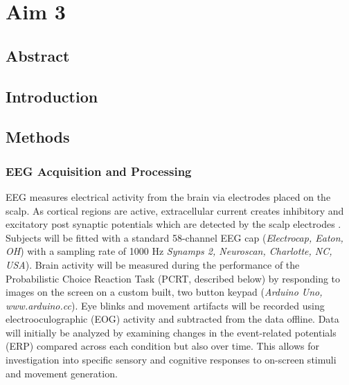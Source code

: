 \chapter{Aim 3}

\section{Abstract}

\section{Introduction}

\section{Methods}



\subsection{EEG Acquisition and Processing}
EEG measures electrical activity from the brain via electrodes placed on the scalp. As cortical regions are active, extracellular current creates inhibitory and excitatory post synaptic potentials which are detected by the scalp electrodes \cite{kuperberg_electroencephalography_2004}. Subjects will be fitted with a standard 58-channel EEG cap (\textit{Electrocap, Eaton, OH}) with a sampling rate of 1000 Hz \textit{Synamps 2, Neuroscan, Charlotte, NC, USA}). Brain activity will be measured during the performance of the Probabilistic Choice Reaction Task (PCRT, described below) by responding to images on the screen on a custom built, two button keypad (\textit{Arduino Uno, www.arduino.cc}). Eye blinks and movement artifacts will be recorded using electrooculographic (EOG) activity and subtracted from the data offline. Data will initially be analyzed by examining changes in the event-related potentials (ERP) compared across each condition but also over time. This allows for investigation into specific sensory and cognitive responses to on-screen stimuli and movement generation.  

